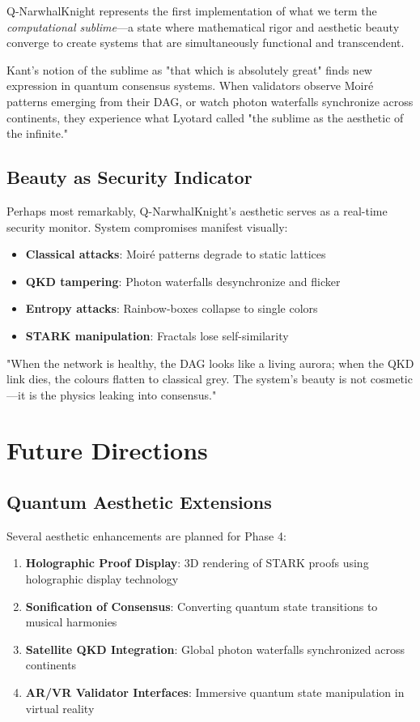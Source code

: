 \documentclass[12pt,a4paper]{article}
\begin{document}
Q-NarwhalKnight represents the first implementation of what we term the \textit{computational sublime}—a state where mathematical rigor and aesthetic beauty converge to create systems that are simultaneously functional and transcendent.

Kant's notion of the sublime as "that which is absolutely great" finds new expression in quantum consensus systems. When validators observe Moiré patterns emerging from their DAG, or watch photon waterfalls synchronize across continents, they experience what Lyotard called "the sublime as the aesthetic of the infinite."

\subsection{Beauty as Security Indicator}

Perhaps most remarkably, Q-NarwhalKnight's aesthetic serves as a real-time security monitor. System compromises manifest visually:

\begin{itemize}
\item \textbf{Classical attacks}: Moiré patterns degrade to static lattices
\item \textbf{QKD tampering}: Photon waterfalls desynchronize and flicker
\item \textbf{Entropy attacks}: Rainbow-boxes collapse to single colors
\item \textbf{STARK manipulation}: Fractals lose self-similarity
\end{itemize}

"When the network is healthy, the DAG looks like a living aurora; when the QKD link dies, the colours flatten to classical grey. The system's beauty is not cosmetic—it is the physics leaking into consensus."

\section{Future Directions}

\subsection{Quantum Aesthetic Extensions}

Several aesthetic enhancements are planned for Phase 4:

\begin{enumerate}
\item \textbf{Holographic Proof Display}: 3D rendering of STARK proofs using holographic display technology
\item \textbf{Sonification of Consensus}: Converting quantum state transitions to musical harmonies
\item \textbf{Satellite QKD Integration}: Global photon waterfalls synchronized across continents
\item \textbf{AR/VR Validator Interfaces}: Immersive quantum state manipulation in virtual reality
\end{enumerate}
\end{document}
